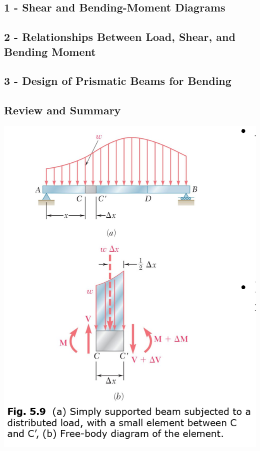 \documentclass[10pt,landscape]{article}
\newenvironment{Figure}
     {\par\medskip\noindent\minipage{\linewidth}}
     {\endminipage\par\medskip}
\begin{document}
\begin{multicols}{3}
\subsection{1 - Shear and Bending-Moment Diagrams}
\subsection{2 - Relationships Between Load, Shear, and Bending Moment}
\subsection{3 - Design of Prismatic Beams for Bending}
\subsection{Review and Summary}
\begin{Figure}
    \centering
    \includegraphics[width=\linewidth]{F_5_9.png}
\end{Figure}

\end{multicols}
\end{document}
